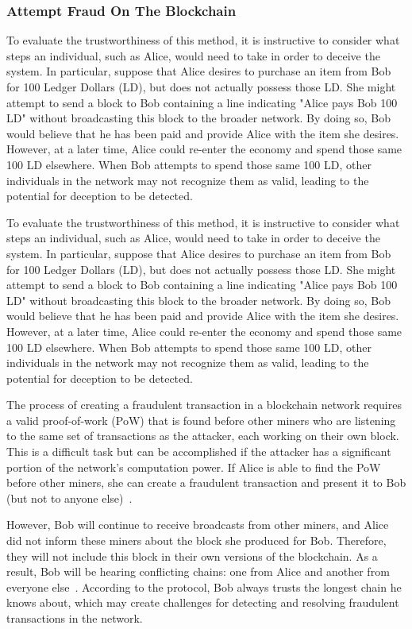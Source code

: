 \subsubsection{Attempt Fraud On The Blockchain}
To evaluate the trustworthiness of this method, it is instructive to consider what steps an individual, such as Alice, would need to take
in order to deceive the system. In particular, suppose that Alice desires to purchase an item from Bob for 100 Ledger Dollars (LD), but
does not actually possess those LD. She might attempt to send a block to Bob containing a line indicating "Alice pays Bob 100 LD"
without broadcasting this block to the broader network. By doing so, Bob would believe that he has been paid and provide Alice with the
item she desires. However, at a later time, Alice could re-enter the economy and spend those same 100 LD elsewhere. When Bob attempts to
spend those same 100 LD, other individuals in the network may not recognize them as valid, leading to the potential for deception to be
detected.

To evaluate the trustworthiness of this method, it is instructive to consider what steps an individual, such as Alice, would need to take
in order to deceive the system. In particular, suppose that Alice desires to purchase an item from Bob for 100 Ledger Dollars (LD), but
does not actually possess those LD. She might attempt to send a block to Bob containing a line indicating "Alice pays Bob 100 LD"
without broadcasting this block to the broader network. By doing so, Bob would believe that he has been paid and provide Alice with the
item she desires. However, at a later time, Alice could re-enter the economy and spend those same 100 LD elsewhere. When Bob attempts to
spend those same 100 LD, other individuals in the network may not recognize them as valid, leading to the potential for deception to be
detected.

The process of creating a fraudulent transaction in a blockchain network requires a valid proof-of-work (PoW) that is found before other
miners who are listening to the same set of transactions as the attacker, each working on their own block. This is a difficult task but
can be accomplished if the attacker has a significant portion of the network's computation power. If Alice is able to find the PoW before
other miners, she can create a fraudulent transaction and present it to Bob (but not to anyone else)~\cite{fang2022cryptocurrency}.

However, Bob will continue to receive broadcasts from other miners, and Alice did not inform these miners about the block she produced for
Bob. Therefore, they will not include this block in their own versions of the blockchain. As a result, Bob will be hearing conflicting
chains: one from Alice and another from everyone else~\cite{TAN2022101625}. According to the protocol, Bob always trusts the longest
chain he knows about, which may create challenges for detecting and resolving fraudulent transactions in the network.

